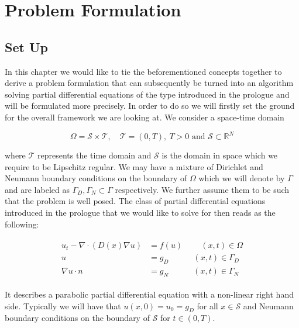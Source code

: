 \documentclass[../draft_1.tex]{subfiles}
\begin{document}
\chapter{Problem Formulation}
\section{Set Up}

In this chapter we would like to tie the beforementioned concepts together to derive a problem formulation that can subsequently be turned into an algorithm solving partial differential equations of the type introduced in the prologue and will be formulated more precisely. In order to do so we will firstly set the ground for the overall framework we are looking at. We consider a space-time domain 
\begin{ceqn}
\begin{equation}
\Omega = \mathcal{S} \times \mathcal{T}, \quad \mathcal{T} = (0,T), \ T>0 \text{ and }  \mathcal{S} \subset \mathbb{R}^N
\end{equation} 
\end{ceqn}
where $\mathcal{T} $ represents the time domain and $ \mathcal{S}$ is the domain in space which we require to be Lipschitz regular. We may have a mixture of Dirichlet and Neumann boundary conditions on the boundary of $\Omega$ which we will denote by $\Gamma$ and are labeled as $\Gamma_D, \Gamma_N \subset \Gamma$ respectively. We further assume them to be such that the problem is well posed. The class of partial differential equations introduced in the prologue that we would like to solve for then reads as the following:
\begin{ceqn}
\begin{align}
\begin{aligned}
u_t - \nabla \cdot (D(x) \nabla u) &= f(u) \qquad \  (x,t) \in \Omega \\
u &= g_D \quad \qquad (x,t)  \in \Gamma_D \\
\nabla u \cdot n &= g_N \quad \qquad (x,t) \in \Gamma_N
\end{aligned}
\end{align}
\end{ceqn}
It describes a parabolic partial differential equation with a non-linear right hand side. Typically we will have that $u(x,0) = u_0 = g_D$ for all $ x \in \mathcal{S}$ and Neumann boundary conditions on the boundary of $\mathcal{S}$ for $t \in (0,T)$. 
\smallskip
\\
\end{document}
